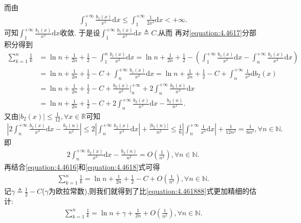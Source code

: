 \documentclass[../../main.tex]{subfiles}%
\begin{document}
\begin{solution}
而由
\begin{align*}
\int_1^{+\infty}{\frac{b_1\left( x \right)}{x^2}\mathrm{d}x}\leqslant \int_1^{+\infty}{\frac{1}{2x^2}\mathrm{d}x}<+\infty .
\end{align*}
可知$\int_1^{+\infty}{\frac{b_1\left( x \right)}{x^2}\mathrm{d}x}$收敛.
于是设$\int_1^{+\infty}{\frac{b_1\left( x \right)}{x^2}\mathrm{d}x}\triangleq C$.从而
再对\eqref{equation:4.4617}分部积分得到
\begin{align}
\sum\limits_{k=1}^n{\frac{1}{k}}&=\ln n+\frac{1}{2n}+\frac{1}{2}-\int_1^n{\frac{b_1\left( x \right)}{x^2}\mathrm{d}x}=\ln n+\frac{1}{2n}+\frac{1}{2}-\left( \int_1^{+\infty}{\frac{b_1\left( x \right)}{x^2}\mathrm{d}x}-\int_n^{+\infty}{\frac{b_1\left( x \right)}{x^2}\mathrm{d}x} \right) 
\nonumber
\\
&=\ln n+\frac{1}{2n}+\frac{1}{2}-C+\int_n^{+\infty}{\frac{b_1\left( x \right)}{x^2}\mathrm{d}x}=\ln n+\frac{1}{2n}+\frac{1}{2}-C+\int_n^{+\infty}{\frac{1}{x^2}\mathrm{d}b_2\left( x \right)}
\nonumber
\\
&=\ln n+\frac{1}{2n}+\frac{1}{2}-C+\frac{b_2\left( x \right)}{x^2}\Big|_{n}^{+\infty}+2\int_n^{+\infty}{\frac{b_2\left( x \right)}{x^3}\mathrm{d}x}
\nonumber
\\
&=\ln n+\frac{1}{2n}+\frac{1}{2}-C+2\int_n^{+\infty}{\frac{b_2\left( x \right)}{x^3}\mathrm{d}x}-\frac{b_2\left( n \right)}{n^2}.
\label{equation:4.4616}
\end{align}
又由$\left| b_2\left( x \right) \right|\leqslant \frac{1}{12},\forall x\in \mathbb{R} $可知
\begin{align*}
\left| 2\int_n^{+\infty}{\frac{b_2\left( x \right)}{x^3}\mathrm{d}x}-\frac{b_2\left( n \right)}{n^2} \right|\leqslant 2\left| \int_n^{+\infty}{\frac{b_2\left( x \right)}{x^3}\mathrm{d}x} \right|+\frac{\left| b_2\left( n \right) \right|}{n^2}\leqslant \frac{1}{6}\left| \int_n^{+\infty}{\frac{1}{x^3}\mathrm{d}x} \right|+\frac{1}{12n^2}=\frac{1}{6n^2},\forall n\in \mathbb{N} .
\end{align*}
即
\begin{align}\label{equation:4.4618}
2\int_n^{+\infty}{\frac{b_2\left( x \right)}{x^3}\mathrm{d}x}-\frac{b_2\left( n \right)}{n^2}=O\left( \frac{1}{n^2} \right) ,\forall n\in \mathbb{N} .
\end{align}
再结合\eqref{equation:4.4616}和\eqref{equation:4.4618}式可得
\begin{align*}
\sum\limits_{k=1}^n{\frac{1}{k}}=\ln n+\frac{1}{2n}+\frac{1}{2}-C+O\left( \frac{1}{n^2} \right) ,\forall n\in \mathbb{N} .
\end{align*}
记$\gamma \triangleq\frac{1}{2}-C$($\gamma$为欧拉常数),则我们就得到了比\eqref{equation:4.461888}式更加精细的估计:
\begin{align*}
\sum\limits_{k=1}^n{\frac{1}{k}}=\ln n+\gamma +\frac{1}{2n}+O\left( \frac{1}{n^2} \right) ,\forall n\in \mathbb{N} .
\end{align*}

\end{solution}
\end{document}
